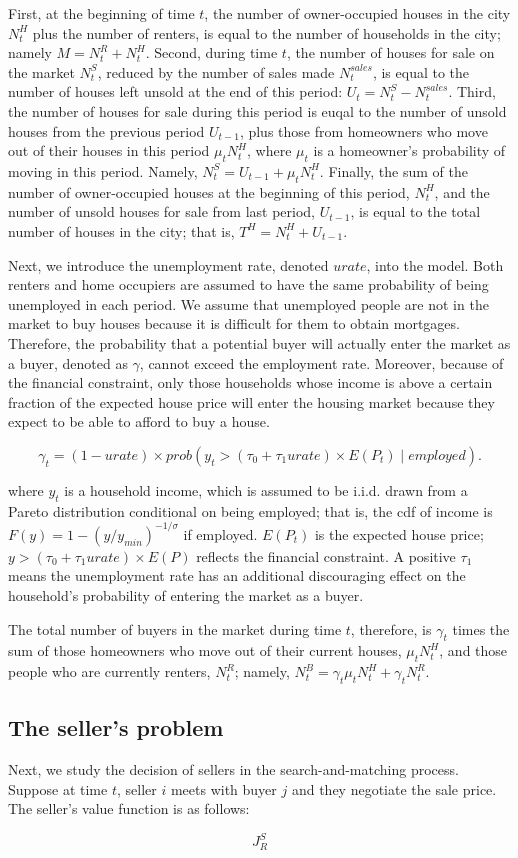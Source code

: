 First, at the beginning of time $t$, the number of owner-occupied houses in the city $N_t^{H}$ plus the number of renters, is equal to the number of households in the city; namely $M = N_t^R + N_t^H$. Second, during time $t$, the number of houses for sale on the market $N_t^S$, reduced by the number of sales made $N_t^{sales}$, is equal to the number of houses left unsold at the end of this period: $U_t = N_t^S - N_t^{sales}$. Third, the number of houses for sale during this period is euqal to the number of unsold houses from the previous period $U_{t-1}$, plus those from homeowners who move out of their houses in this period $\mu_t N_t^H$, where $\mu_t$ is a homeowner's probability of moving in this period. Namely, $N_t^S = U_{t - 1} + \mu_t N_t^H$. Finally, the sum of the number of owner-occupied houses at the beginning of this period, $N_t^H$, and the number of unsold houses for sale from last period, $U_{t - 1}$, is equal to the total number of houses in the city; that is, $T^H = N_t^H + U_{t - 1}$.

Next, we introduce the unemployment rate, denoted $urate$, into the model. Both renters and home occupiers are assumed to have the same probability of being unemployed in each period. We assume that unemployed people are not in the market to buy houses because it is difficult for them to obtain mortgages. Therefore, the probability that a potential buyer will actually enter the market as a buyer, denoted as $\gamma$, cannot exceed the employment rate. Moreover, because of the financial constraint, only those households whose income is above a certain fraction of the expected house price will enter the housing market because they expect to be able to afford to buy a house.

\begin{equation}
    \gamma_t = (1 - urate) \times prob(y_t > (\tau_0 + \tau_1 urate) \times E(P_t) \mid employed).
\end{equation}

where $y_t$ is a household income, which is assumed to be i.i.d. drawn from a Pareto distribution conditional on being employed; that is, the cdf of income is $F(y) = 1 - (y / y_{min})^{-1/\sigma}$ if employed. $E(P_t)$ is the expected house price; $y> (\tau_0 + \tau_1 urate) \times E(P)$ reflects the financial constraint. A positive $\tau_1$ means the unemployment rate has an additional discouraging effect on the household's probability of entering the market as a buyer.

The total number of buyers in the market during time $t$, therefore, is $\gamma_t$ times the sum of those homeowners who move out of their current houses, $\mu_t N_t^H$, and those people who are currently renters, $N_t^R$; namely, $N_t^B = \gamma_t \mu_t N_t^H + \gamma_t N_t^R$.

\subsection{The seller's problem}

Next, we study the decision of sellers in the search-and-matching process. Suppose at time $t$, seller $i$ meets with buyer $j$ and they negotiate the sale price. The seller's value function is as follows:

\begin{equation}
    J_R^S
\end{equation}
